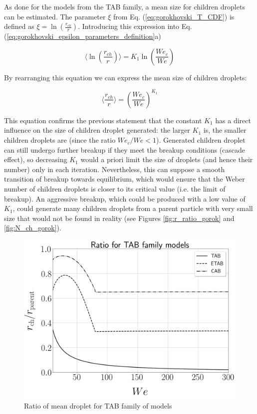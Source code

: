 As done for the models from the TAB family, a mean size for children droplets can be estimated. The parameter $\xi$ from Eq. (\ref{eq:gorokhovski_T_CDF}) is defined as $\xi = \ln \left( \frac{r_{ch}}{r}  \right)$. Introducing this expression into Eq. (\ref{eq:gorokhovski_epsilon_parameters_definition}a) 

\begin{equation}
\langle \ln \left( \frac{r_{ch}}{r}  \right) \rangle = K_1  \ln \left(  \frac{We_c}{We}  \right) 
\end{equation}

By rearranging this equation we can express the mean size of children droplets:

\begin{equation}
\langle  \frac{r_{ch}}{r} \rangle = \left( \frac{We_c}{We} \right)^{K_1}
\end{equation}

This equation confirms the previous statement that the constant $K_1$ has a direct influence on the size of children droplet generated: the larger $K_1$ is, the smaller children droplets are (since the ratio $We_c/We < 1$). Generated children droplet can still undergo further breakup if they meet the breakup conditions (cascade effect), so decreasing $K_1$ would a priori limit the size of droplets (and hence their number) only in each iteration. Nevertheless, this can suppose a smooth transition of breakup towards equilibrium, which would ensure that the Weber number of children droplets is closer to its critical value (i.e. the limit of breakup). An aggressive breakup, which could be produced with a low value of $K_1$, could generate many children droplets from a parent particle with very small size that would not be found in reality (see Figures \ref{fig:r_ratio_gorok} and \ref{fig:N_ch_gorok}).



\begin{figure}[h!]
	\centering
	\includegraphics[scale=0.2]{./part2_developments/figures_ch4_SLI/ratio_droplet_size_TAB}
	\caption{Ratio of mean droplet for TAB family of models}
	\label{fig:r_ratio_TAB}
\end{figure}


